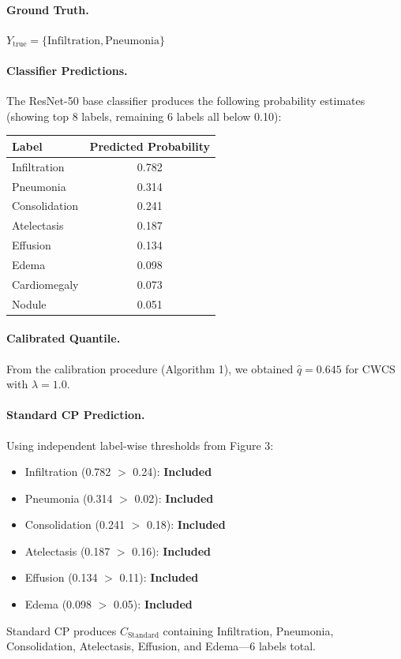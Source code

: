 \paragraph{Ground Truth.} $Y_{\text{true}} = \{\text{Infiltration}, \text{Pneumonia}\}$

\paragraph{Classifier Predictions.} The ResNet-50 base classifier produces the following probability estimates (showing top 8 labels, remaining 6 labels all below 0.10):

\begin{center}
\begin{tabular}{lc}
\toprule
Label & Predicted Probability \\
\midrule
Infiltration & 0.782 \\
Pneumonia & 0.314 \\
Consolidation & 0.241 \\
Atelectasis & 0.187 \\
Effusion & 0.134 \\
Edema & 0.098 \\
Cardiomegaly & 0.073 \\
Nodule & 0.051 \\
\bottomrule
\end{tabular}
\end{center}

\paragraph{Calibrated Quantile.} From the calibration procedure (Algorithm 1), we obtained $\hat{q} = 0.645$ for CWCS with $\lambda = 1.0$.

\paragraph{Standard CP Prediction.} Using independent label-wise thresholds from Figure 3:
\begin{itemize}
    \item Infiltration (0.782 $>$ 0.24): \textbf{Included}
    \item Pneumonia (0.314 $>$ 0.02): \textbf{Included}
    \item Consolidation (0.241 $>$ 0.18): \textbf{Included}
    \item Atelectasis (0.187 $>$ 0.16): \textbf{Included}
    \item Effusion (0.134 $>$ 0.11): \textbf{Included}
    \item Edema (0.098 $>$ 0.05): \textbf{Included}
\end{itemize}
Standard CP produces $C_{\text{Standard}}$ containing Infiltration, Pneumonia, Consolidation, Atelectasis, Effusion, and Edema---6 labels total.


